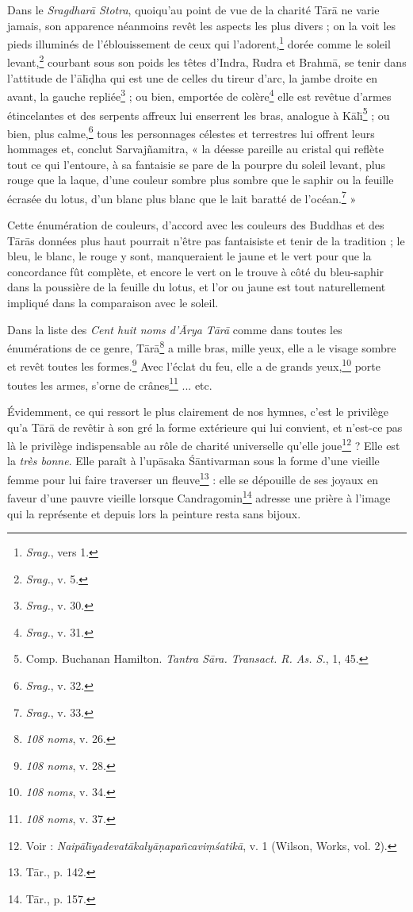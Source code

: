 \documentclass[a4paper, 11pt, oneside, french]{article}
\begin{document}
Dans le \emph{Sragdhar\={a} Stotra}, quoiqu'au point de vue de la charité T\={a}r\={a} ne varie jamais, son apparence néanmoins revêt les aspects les plus divers ; on la voit les pieds illuminés de l'éblouissement de ceux qui l'adorent,\footnote{\emph{Srag.}, vers 1.} dorée comme le soleil levant,\footnote{\emph{Srag.}, v. 5.} courbant sous son poids les têtes d'Indra, Rudra et Brahm\={a}, se tenir dans l'attitude de l'\={a}l\={\i}\d{d}ha qui est une de celles du tireur d'arc, la jambe droite en avant, la gauche repliée\footnote{\emph{Srag.}, v. 30.} ; ou bien, emportée de colère\footnote{\emph{Srag.}, v. 31.} elle est revêtue d'armes étincelantes et des serpents affreux lui enserrent les bras, analogue à K\={a}l\={\i}\footnote{Comp. Buchanan Hamilton. \emph{Tantra S\={a}ra. Transact. R. As. S.}, 1, 45.} ; ou bien, plus calme,\footnote{\emph{Srag.}, v. 32.} tous les personnages célestes et terrestres lui offrent leurs hommages et, conclut Sarvaj\~{n}amitra, « la déesse pareille au cristal qui reflète tout ce qui l'entoure, à sa fantaisie se pare de la pourpre du soleil levant, plus rouge que la laque, d'une couleur sombre plus sombre que le saphir ou la feuille écrasée du lotus, d'un blanc plus blanc que le lait baratté de l'océan.\footnote{\emph{Srag.}, v. 33.} »

Cette énumération de couleurs, d'accord avec les couleurs des Buddhas et des T\={a}r\={a}s données plus haut pourrait n'être pas fantaisiste et tenir de la tradition ; le bleu, le blanc, le rouge y sont, manqueraient le jaune et le vert pour que la concordance fût complète, et encore le vert on le trouve à côté du bleu-saphir dans la poussière de la feuille du lotus, et l'or ou jaune est tout naturellement impliqué dans la comparaison avec le soleil.

Dans la liste des \emph{Cent huit noms d'\={A}rya T\={a}r\={a}} comme dans toutes les énumérations de ce genre, T\={a}r\={a}\footnote{\emph{108 noms}, v. 26.} a mille bras, mille yeux, elle a le visage sombre et revêt toutes les formes.\footnote{\emph{108 noms}, v. 28.} Avec l'éclat du feu, elle a de grands yeux,\footnote{\emph{108 noms}, v. 34.} porte toutes les armes, s'orne de crânes\footnote{\emph{108 noms}, v. 37.} ... etc.

Évidemment, ce qui ressort le plus clairement de nos hymnes, c'est le privilège qu'a T\={a}r\={a} de revêtir à son gré la forme extérieure qui lui convient, et n'est-ce pas là le privilège indispensable au rôle de charité universelle qu'elle joue\footnote{Voir : \emph{Naip\={a}l\={\i}yadevat\={a}kaly\={a}\d{n}apa\~{n}cavi\d{m}\'{s}atik\={a}}, v. 1 (Wilson, Works, vol. 2).} ? Elle est la \emph{très bonne}. Elle paraît à l'up\={a}saka \'{S}\={a}ntivarman sous la forme d'une vieille femme pour lui faire traverser un fleuve\footnote{T\={a}r., p. 142.} : elle se dépouille de ses joyaux en faveur d'une pauvre vieille lorsque Candragomin\footnote{T\={a}r., p. 157.} adresse une prière à l'image qui la représente et depuis lors la peinture resta sans bijoux.
\clearpage
\end{document}

